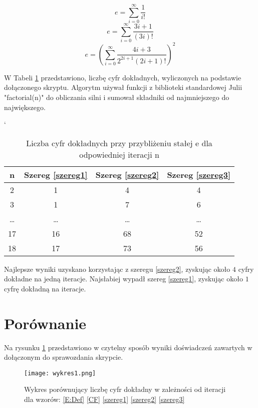 \documentclass{article}
\begin{document}
\begin{equation}\label{szereg1}
e =  \sum_{i=0}^{\infty} \frac{1}{i!} 
\end{equation}
\begin{equation}\label{szereg2}
e =   \sum_{i=0}^{\infty}  \frac{3i+1}{\left(3i\right)!} 
\end{equation}
\begin{equation}\label{szereg3}
e = \left(\sum_{i=0}^{\infty}  \frac{4i+3}{2^{2i+1}\left(2i+1\right)!}\right)^{2}
\end{equation}

W Tabeli \ref{res,szeregi} przedstawiono, liczbę cyfr dokładnych, wyliczonych na podstawie dołączonego skryptu. Algorytm używał funkcji z biblioteki standardowej Julii "factorial(n)" do obliczania silni i sumował składniki od najmniejszego do największego.
\\
\begin{table}[h]
`	\centering
	\begin{tabular}{|c|c|c|c|}	\hline
		n & Szereg \eqref{szereg1} & Szereg \eqref{szereg2} & Szereg \eqref{szereg3} \\ \hline
		2 & 1& 4& 4 \\
		3 & 1& 7& 6 \\
		\dots & \dots & \dots & \dots \\
		17 & 16& 68& 52 \\
		18 & 17& 73& 56 \\ \hline
	\end{tabular}
	\caption{Liczba cyfr dokładnych przy przybliżeniu stałej e dla odpowiedniej iteracji n}
	\label{res,szeregi}
\end{table}

Najlepsze wyniki uzyskano korzystając z szeregu \eqref{szereg2}, zyskując około $4$ cyfry dokładne na jedną iteracje. Najsłabiej wypadł szereg \eqref{szereg1}, zyskując około $1$ cyfrę dokładną na iteracje.

\section{Porównanie}

Na rysunku \ref{W1} przedstawiono w czytelny sposób wyniki doświadczeń zawartych w dołączonym do sprawozdania skrypcie.

\begin{figure}[h]
\centering
\texttt{[image: wykres1.png]}
\caption{Wykres porównujący liczbę cyfr dokładny w zależności od iteracji dla wzorów: \eqref{E:Def} \eqref{CF} \eqref{szereg1} \eqref{szereg2} \eqref{szereg3}}
\label{W1}
\end{figure}
\end{document}
